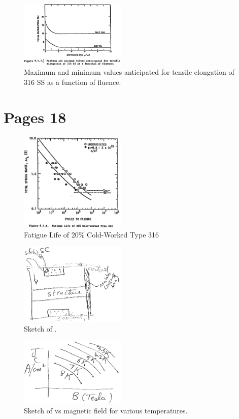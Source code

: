 \documentclass[11pt]{article}
\begin{document}
\begin{figure}[H]
  \centering
  \includegraphics[width=0.45\textwidth]{figs/fig12.png}
  \caption{Maximum and minimum values anticipated for tensile elongation of 316 SS as a function of fluence.}
\end{figure}

\section{Pages 18}

\begin{figure}[H]
  \centering
  \includegraphics[width=0.45\textwidth]{figs/fig13.png}
  \caption{Fatigue Life of 20\% Cold-Worked Type 316}
\end{figure}

\begin{figure}[H]
  \centering
  \includegraphics[width=0.45\textwidth]{figs/fig15.png}
  \caption{Sketch of .}
\end{figure}

\begin{figure}[H]
  \centering
  \includegraphics[width=0.45\textwidth]{figs/fig14.png}
  \caption{Sketch of vs magnetic field for various temperatures.}
\end{figure}
\end{document}
